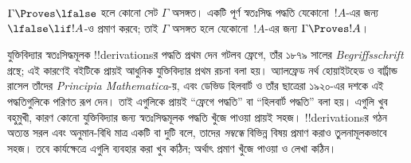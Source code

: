 \documentclass[../../../include/open-logic-section]{subfiles}
\begin{document}
$\Gamma \Proves \lfalse$ হলে কোনো সেট $\Gamma$ অসঙ্গত। একটি পূর্ণ
স্বতঃসিদ্ধ পদ্ধতি যেকোনো~$!A$-এর জন্য $\lfalse \lif !A$-ও প্রমাণ করবে;
তাই $\Gamma$ অসঙ্গত হলে যেকোনো~$!A$-এর জন্য $\Gamma \Proves !A$।

যুক্তিবিদ্যার স্বতঃসিদ্ধমূলক !!{derivation}sর পদ্ধতি প্রথম দেন
গটলব ফ্রেগে, তাঁর ১৮৭৯ সালের \emph{Begriffsschrift} গ্রন্থে; এই কারণেই
বইটিকে প্রায়ই আধুনিক যুক্তিবিদ্যার প্রথম রচনা বলা হয়। অ্যালফ্রেড নর্থ
হোয়াইটহেড ও বার্ট্রান্ড রাসেল তাঁদের \emph{Principia Mathematica}-য়,
এবং ডেভিড হিলবার্ট ও তাঁর ছাত্রেরা ১৯২০-এর দশকে এই পদ্ধতিগুলিকে
পরিণত রূপ দেন। তাই এগুলিকে প্রায়ই “ফ্রেগে পদ্ধতি” বা “হিলবার্ট
পদ্ধতি” বলা হয়। এগুলি খুব বহুমুখী, কারণ কোনো যুক্তিবিদ্যার জন্য
স্বতঃসিদ্ধমূলক পদ্ধতি খুঁজে পাওয়া প্রায়ই সহজ। !!{derivation}sর গঠন
অত্যন্ত সরল এবং অনুমান-বিধি মাত্র একটি বা দুটি বলে, তাদের \emph{সম্বন্ধে}
বিভিন্ন বিষয় প্রমাণ করাও তুলনামূলকভাবে সহজ। তবে কার্যক্ষেত্রে এগুলি
ব্যবহার করা খুব কঠিন; অর্থাৎ প্রমাণ খুঁজে পাওয়া ও লেখা কঠিন।
\end{document}
